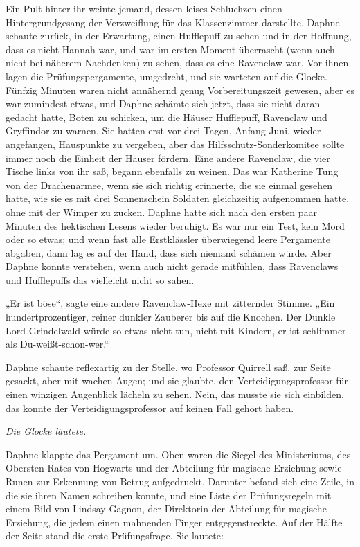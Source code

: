 {Ein Pult hinter ihr weinte jemand, dessen leises Schluchzen einen Hintergrundgesang der Verzweiflung für das Klassenzimmer darstellte. Daphne schaute zurück, in der Erwartung, einen Hufflepuff zu sehen und in der Hoffnung, dass es nicht Hannah war, und war im ersten Moment überrascht (wenn auch nicht bei näherem Nachdenken) zu sehen, dass es eine Ravenclaw war. Vor ihnen lagen die Prüfungspergamente, umgedreht, und sie warteten auf die Glocke. Fünfzig Minuten waren nicht annähernd genug Vorbereitungszeit gewesen, aber es war zumindest etwas, und Daphne schämte sich jetzt, dass sie nicht daran gedacht hatte, Boten zu schicken, um die Häuser Hufflepuff, Ravenclaw und Gryffindor zu warnen. Sie hatten erst vor drei Tagen, Anfang Juni, wieder angefangen, Hauspunkte zu vergeben, aber das Hilfsschutz-Sonderkomitee sollte immer noch die Einheit der Häuser fördern. Eine andere Ravenclaw, die vier Tische links von ihr saß, begann ebenfalls zu weinen. Das war Katherine Tung von der Drachenarmee, wenn sie sich richtig erinnerte, die sie einmal gesehen hatte, wie sie es mit drei Sonnenschein Soldaten gleichzeitig aufgenommen hatte, ohne mit der Wimper zu zucken. Daphne hatte sich nach den ersten paar Minuten des hektischen Lesens wieder beruhigt. Es war nur ein Test, kein Mord oder so etwas; und wenn fast alle Erstklässler überwiegend leere Pergamente abgaben, dann lag es auf der Hand, dass sich niemand schämen würde. Aber Daphne konnte verstehen, wenn auch nicht gerade mitfühlen, dass Ravenclaws und Hufflepuffs das vielleicht nicht so sahen.

„Er ist böse“, sagte eine andere Ravenclaw-Hexe mit zitternder Stimme. „Ein hundertprozentiger, reiner dunkler Zauberer bis auf die Knochen. Der Dunkle Lord Grindelwald würde so etwas nicht tun, nicht mit Kindern, er ist schlimmer als Du-weißt-schon-wer.“

Daphne schaute reflexartig zu der Stelle, wo Professor Quirrell saß, zur Seite gesackt, aber mit wachen Augen; und sie glaubte, den Verteidigungsprofessor für einen winzigen Augenblick lächeln zu sehen. Nein, das musste sie sich einbilden, das konnte der Verteidigungsprofessor auf keinen Fall gehört haben.

\emph{Die Glocke läutete.}

Daphne klappte das Pergament um. Oben waren die Siegel des Ministeriums, des Obersten Rates von Hogwarts und der Abteilung für magische Erziehung sowie Runen zur Erkennung von Betrug aufgedruckt. Darunter befand sich eine Zeile, in die sie ihren Namen schreiben konnte, und eine Liste der Prüfungsregeln mit einem Bild von Lindsay Gagnon, der Direktorin der Abteilung für magische Erziehung, die jedem einen mahnenden Finger entgegenstreckte. Auf der Hälfte der Seite stand die erste Prüfungsfrage. Sie lautete:

}
